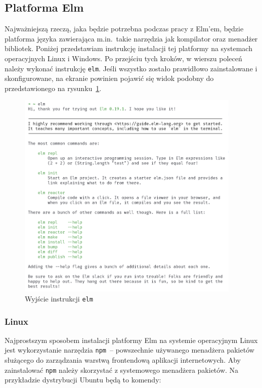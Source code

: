 \documentclass[twoside,a4paper]{report}
\begin{document}
\subsection*{Platforma Elm}
Najważniejszą rzeczą, jaka będzie potrzebna podczas pracy z Elm'em, będzie platforma języka zawierająca m.in.~takie narzędzia jak kompilator oraz menadżer bibliotek.
Poniżej przedstawiam instrukcję instalacji tej platformy na systemach operacyjnych Linux i Windows.
Po przejściu tych kroków, w wierszu poleceń należy wykonać instrukcję \texttt{elm}.
Jeśli wszystko zostało prawidłowo zainstalowane i skonfigurowane, na ekranie powinien pojawić się widok podobny do przedstawionego na rysunku~\ref{lab:elm_output}.

\begin{figure}[H]
    \centering
    \includegraphics[width=0.95\textwidth]{img/elm_output.png}
    \caption{Wyjście instrukcji \texttt{elm}}\label{lab:elm_output}
\end{figure}

\subsubsection{Linux}
Najprostszym sposobem instalacji platformy Elm na systemie operacyjnym Linux jest wykorzystanie narzędzia \texttt{npm}~-- powszechnie używanego menadżera pakietów służącego do zarządzania warstwą frontendową aplikacji internetowych.
Aby zainstalować \texttt{npm} należy skorzystać z systemowego menadżera pakietów.
Na przykładzie dystrybucji Ubuntu będą to komendy:
\end{document}
